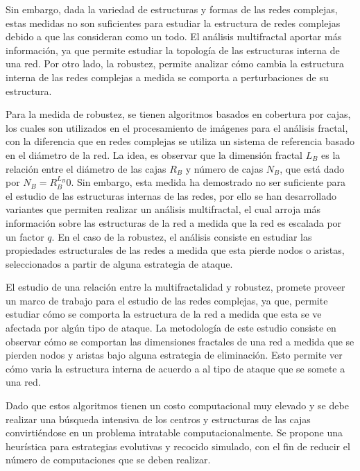 Sin embargo, dada la variedad de estructuras y formas de las redes complejas, estas medidas no son suficientes para estudiar la estructura de redes complejas debido a que las consideran como un todo\cite{Song2005}. El análisis multifractal aportar más información\cite{Li2014}, ya que permite estudiar la topología de las estructuras interna de una red. Por otro lado, la robustez\cite{Schneider2011}, permite analizar cómo cambia la estructura interna de las redes complejas a medida se comporta a perturbaciones de su estructura.

Para la medida de robustez, se tienen algoritmos basados en cobertura por cajas\cite{Song2007}, los cuales son utilizados en el procesamiento de imágenes para el análisis fractal, con la diferencia que en redes complejas se utiliza un sistema de referencia basado en el diámetro de la red. La idea, es observar que la dimensión fractal $L_B$ es la relación entre el diámetro de las cajas $R_B$ y número de cajas $N_B$, que está dado por $N_B=R_{B}^{L_B}0$. Sin embargo, esta medida ha demostrado no ser suficiente para el estudio de las estructuras internas de las redes\cite{Wang2012}, por ello se han desarrollado variantes que permiten realizar un análisis multifractal, el cual arroja más información sobre las estructuras de la red a medida que la red es escalada por un factor $q$. En el caso de la robustez, el análisis consiste en estudiar las propiedades estructurales de las redes a medida que esta pierde nodos o aristas, seleccionados a partir de alguna estrategia de ataque.

El estudio de una relación entre la multifractalidad y robustez, promete proveer un marco de trabajo para el estudio de las redes complejas, ya que, permite estudiar cómo se comporta la estructura de la red a medida que esta se ve afectada por algún tipo de ataque. La metodología de este estudio consiste en observar cómo se comportan las dimensiones fractales de una red a medida que se pierden nodos y aristas bajo alguna estrategia de eliminación. Esto permite ver cómo varia la estructura interna de acuerdo a al tipo de ataque que se somete a una red.

Dado que estos algoritmos tienen un costo computacional muy elevado y se debe realizar una búsqueda intensiva de los centros y estructuras de las cajas convirtiéndose en un problema intratable computacionalmente. Se propone una heurística para estrategias evolutivas y recocido simulado, con el fin de reducir el número de computaciones que se deben realizar.

